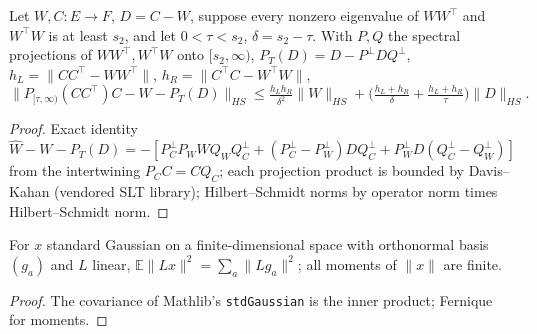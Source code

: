 \begin{lemma}\label{lem:truncation_second_order}
\leanok
Let $W,C:E\to F$, $D=C-W$, suppose every nonzero eigenvalue of $WW^\top$ and $W^\top W$ is
at least $s_2$, and let $0<\tau<s_2$, $\delta=s_2-\tau$. With $P,Q$ the spectral
projections of $WW^\top,W^\top W$ onto $[s_2,\infty)$, $P_T(D)=D-P^\perp DQ^\perp$,
$h_L=\|CC^\top-WW^\top\|$, $h_R=\|C^\top C-W^\top W\|$,
\[\|P_{[\tau,\infty)}(CC^\top)C-W-P_T(D)\|_{HS}\le\tfrac{h_Lh_R}{\delta^2}\|W\|_{HS}
+\big(\tfrac{h_L+h_R}{\delta}+\tfrac{h_L+h_R}{\tau}\big)\|D\|_{HS}.\]
\end{lemma}
\begin{proof}
\leanok
Exact identity $\widehat W-W-P_T(D)=-[P_C^\perp P_W WQ_WQ_C^\perp+(P_C^\perp-P_W^\perp)DQ_C^\perp
+P_W^\perp D(Q_C^\perp-Q_W^\perp)]$ from the intertwining $P_C C=CQ_C$; each projection
product is bounded by Davis--Kahan (vendored SLT library); Hilbert--Schmidt norms by
operator norm times Hilbert--Schmidt norm.
\end{proof}

\begin{lemma}\label{lem:gaussian_trace}
\leanok
For $x$ standard Gaussian on a finite-dimensional space with orthonormal basis $(g_a)$ and
$L$ linear, $\mathbb E\|Lx\|^2=\sum_a\|Lg_a\|^2$; all moments of $\|x\|$ are finite.
\end{lemma}
\begin{proof}
\leanok
The covariance of Mathlib's \texttt{stdGaussian} is the inner product; Fernique for moments.
\end{proof}

